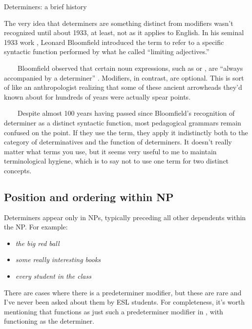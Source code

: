 \begin{tblsframed}{Determiners: a brief history}

The very idea that determiners are something distinct from modifiers wasn't recognized until about 1933, at least, not as it applies to English. In his seminal 1933 work , Leonard Bloomfield introduced the term  to refer to a specific syntactic function performed by what he called ``limiting adjectives.''

~~~~Bloomfield observed that certain noun expressions, such as  or , are \enquote{always accompanied by a determiner} \citep[203]{bloomfield1984language}. Modifiers, in contrast, are optional. This is sort of like an anthropologist realizing that some of these ancient arrowheads they'd known about for hundreds of years were actually spear points.

~~~~Despite almost 100 years having passed since Bloomfield's recognition of determiner as a distinct syntactic function, most pedagogical grammars remain confused on the point. If they use the term, they apply it indistinctly both to the category of determinatives and the function of determiners. It doesn't really matter what terms you use, but it seems very useful to me to maintain terminological hygiene, which is to say not to use one term for two distinct concepts.

\end{tblsframed}

\subsection{Position and ordering within NP}

Determiners appear only in NPs, typically preceding all other dependents within the NP. For example:

\begin{itemize}[noitemsep]
   \item \textit{\emph{the} big red ball}
   \item \textit{\emph{some} really interesting books}
   \item \textit{\emph{every} student in the class}
\end{itemize}

There are cases where there is a predeterminer modifier, but these are rare and I've never been asked about them by ESL students. For completeness, it's worth mentioning that  functions as just such a predeterminer modifier in , with  functioning as the determiner.

